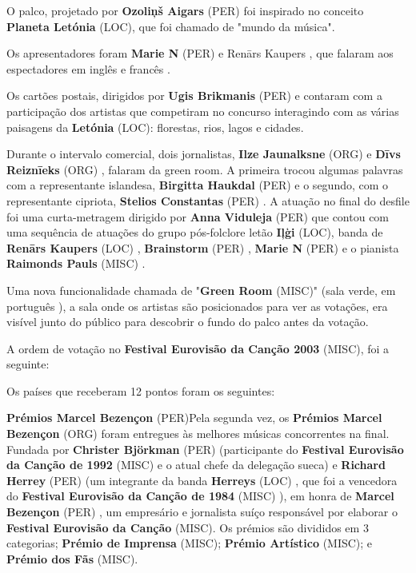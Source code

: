 \documentclass[12pt,a4paper]{article}
\begin{document}
O palco, projetado por \textbf{Ozoliņš Aigars} (PER) foi inspirado no conceito \textbf{Planeta Letónia} (LOC), que foi chamado de "mundo da música".

Os apresentadores foram \textbf{Marie N} (PER) e Renārs Kaupers , que falaram aos espectadores em inglês e francês .

Os cartões postais, dirigidos por \textbf{Ugis Brikmanis} (PER) e contaram com a participação dos artistas que competiram no concurso interagindo com as várias paisagens da \textbf{Letónia} (LOC): florestas, rios, lagos e cidades.

Durante o intervalo comercial, dois jornalistas, \textbf{Ilze Jaunalksne} (ORG) e \textbf{Dīvs Reiznīeks} (ORG) , falaram da green room. A primeira trocou algumas palavras com a representante islandesa, \textbf{Birgitta Haukdal} (PER) e o segundo, com o representante cipriota, \textbf{Stelios Constantas} (PER) . A atuação no final do desfile foi uma curta-metragem dirigido por \textbf{Anna Viduleja} (PER) que contou com uma sequência de atuações do grupo pós-folclore letão \textbf{Iļģi} (LOC), banda de \textbf{Renārs Kaupers} (LOC) , \textbf{Brainstorm} (PER) , \textbf{Marie N} (PER) e o pianista \textbf{Raimonds Pauls} (MISC) .

Uma nova funcionalidade chamada de "\textbf{Green Room} (MISC)" (sala verde, em português ), a sala onde os artistas são posicionados para ver as votações, era visível junto do público para descobrir o fundo do palco antes da votação.

A ordem de votação no \textbf{Festival Eurovisão da Canção 2003} (MISC), foi a seguinte:

Os países que receberam 12 pontos foram os seguintes:



\textbf{Prémios Marcel Bezençon} (PER)Pela segunda vez, os \textbf{Prémios Marcel Bezençon} (ORG) foram entregues às melhores músicas concorrentes na final. Fundada por \textbf{Christer Björkman} (PER) (participante do \textbf{Festival Eurovisão da Canção de 1992} (MISC) e o atual chefe da delegação sueca) e \textbf{Richard Herrey} (PER) (um integrante da banda \textbf{Herreys} (LOC) , que foi a vencedora do \textbf{Festival Eurovisão da Canção de 1984} (MISC) ), em honra de \textbf{Marcel Bezençon} (PER) , um empresário e jornalista suíço responsável por elaborar o \textbf{Festival Eurovisão da Canção} (MISC). Os prémios são divididos em 3 categorias; \textbf{Prémio de Imprensa} (MISC); \textbf{Prémio Artístico} (MISC); e \textbf{Prémio dos Fãs} (MISC).
\end{document}
